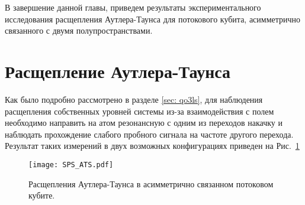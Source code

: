 В завершение данной главы, приведем результаты экспериментального исследования расщепления Аутлера-Таунса для потокового кубита, асимметрично связанного с двумя полупространствами. 

\section{Расщепление Аутлера-Таунса}
Как было подробно рассмотрено в разделе \ref{sec: qo3ls}, для наблюдения расщепления собственных уровней системы из-за взаимодействия с полем необходимо направить на атом резонансную с одним из переходов накачку и наблюдать прохождение слабого пробного сигнала на частоте другого перехода. Результат таких измерений в двух возможных конфигурациях приведен на Рис.~\ref{}
\begin{figure}
	\centering
	\texttt{[image: SPS\_ATS.pdf]}
	\caption[Расщепления Аутлера-Таунса в асимметрично связанном потоковом кубите.]{Расщепления Аутлера-Таунса в асимметрично связанном потоковом кубите.}
	\label{fig: sps_ats}
\end{figure}